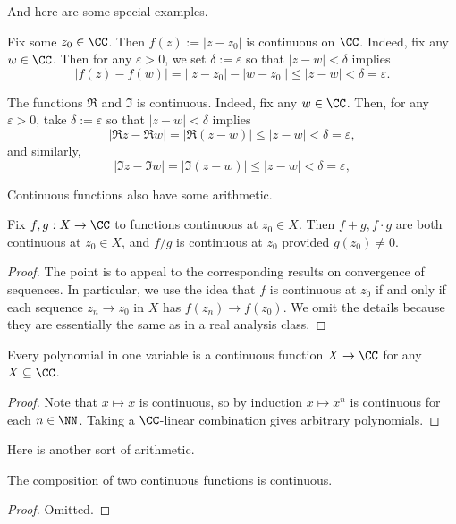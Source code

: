 And here are some special examples.
\begin{example}
	Fix some $z_0\in\CC$. Then $f(z):=|z-z_0|$ is continuous on $\CC$. Indeed, fix any $w\in\CC$. Then for any $\varepsilon>0$, we set $\delta:=\varepsilon$ so that $|z-w|<\delta$ implies
	\[|f(z)-f(w)|=\big||z-z_0|-|w-z_0|\big|\le|z-w|<\delta=\varepsilon.\]
\end{example}
\begin{example}
	The functions $\Re$ and $\Im$ is continuous. Indeed, fix any $w\in\CC$. Then, for any $\varepsilon>0$, take $\delta:=\varepsilon$ so that $|z-w|<\delta$ implies
	\[|\Re z-\Re w|=|\Re(z-w)|\le|z-w|<\delta=\varepsilon,\]
	and similarly,
	\[|\Im z-\Im w|=|\Im(z-w)|\le|z-w|<\delta=\varepsilon,\]
\end{example}
Continuous functions also have some arithmetic.
\begin{proposition} \label{prop:combinecontfuncs}
	Fix $f,g:X\to\CC$ to functions continuous at $z_0\in X$. Then $f+g,f\cdot g$ are both continuous at $z_0\in X$, and $f/g$ is continuous at $z_0$ provided $g(z_0)\ne0$.
\end{proposition}
\begin{proof}
	The point is to appeal to the corresponding results on convergence of sequences. In particular, we use the idea that $f$ is continuous at $z_0$ if and only if each sequence $z_n\to z_0$ in $X$ has $f(z_n)\to f(z_0)$. We omit the details because they are essentially the same as in a real analysis class.
\end{proof}
\begin{cor}
	Every polynomial in one variable is a continuous function $X\to\CC$ for any $X\subseteq\CC$.
\end{cor}
\begin{proof}
	Note that $x\mapsto x$ is continuous, so by induction $x\mapsto x^n$ is continuous for each $n\in\NN$. Taking a $\CC$-linear combination gives arbitrary polynomials.
\end{proof}
Here is another sort of arithmetic.
\begin{lemma}
	The composition of two continuous functions is continuous.
\end{lemma}
\begin{proof}
	Omitted.
\end{proof}

